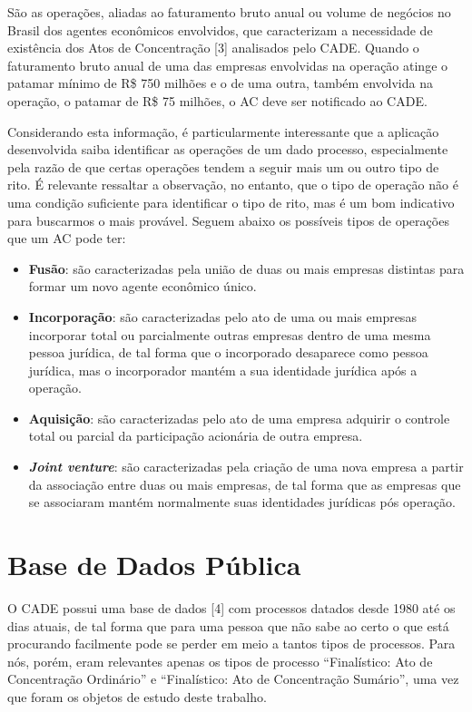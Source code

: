 \documentclass[11pt]{report}
\newcommand{\quotes}[1]{``#1''}
\begin{document}
\indent\indent São as operações, aliadas ao faturamento bruto anual ou volume de negócios no Brasil dos agentes econômicos envolvidos, que caracterizam a necessidade de existência dos
Atos de Concentração [3] analisados pelo CADE. Quando o faturamento bruto anual de uma das empresas envolvidas na operação atinge o patamar mínimo de R\$ 750 milhões e o de uma outra, também envolvida na operação, o patamar de R\$ 75 milhões, o AC deve ser notificado ao CADE.

Considerando esta informação, é particularmente interessante que a aplicação desenvolvida saiba identificar as operações de um dado processo, especialmente
pela razão de que certas operações tendem a seguir mais um ou outro tipo de rito. É relevante ressaltar a observação, no entanto, que o tipo de operação não é uma condição suficiente
para identificar o tipo de rito, mas é um bom indicativo para buscarmos o mais provável. Seguem abaixo
os possíveis tipos de operações que um AC pode ter:

\begin{itemize}
  \item \textbf{Fusão}: são caracterizadas pela união de duas ou mais empresas distintas para formar um novo agente econômico único.
  \item \textbf{Incorporação}: são caracterizadas pelo ato de uma ou mais empresas incorporar total ou parcialmente outras empresas dentro de uma mesma pessoa jurídica,
  de tal forma que o incorporado desaparece como pessoa jurídica, mas o incorporador mantém a sua identidade jurídica após a operação.
  \item \textbf{Aquisição}: são caracterizadas pelo ato de uma empresa adquirir o controle total ou parcial da participação acionária de outra empresa.
  \item \textbf{\textit{Joint venture}}: são caracterizadas pela criação de uma nova empresa a partir da associação entre duas ou mais empresas, de tal forma
  que as empresas que se associaram mantém normalmente suas identidades jurídicas pós operação.
\end{itemize}

\section{Base de Dados Pública}

\indent\indent O CADE possui uma base de dados [4] com processos datados desde 1980 até os dias atuais, de tal forma que
para uma pessoa que não sabe ao certo o que está procurando facilmente pode se perder em meio a tantos tipos de processos. Para nós, porém, eram relevantes apenas
os tipos de processo \quotes{Finalístico: Ato de Concentração Ordinário} e \quotes{Finalístico: Ato de Concentração Sumário}, uma vez que foram os objetos de estudo deste trabalho.
\end{document}
